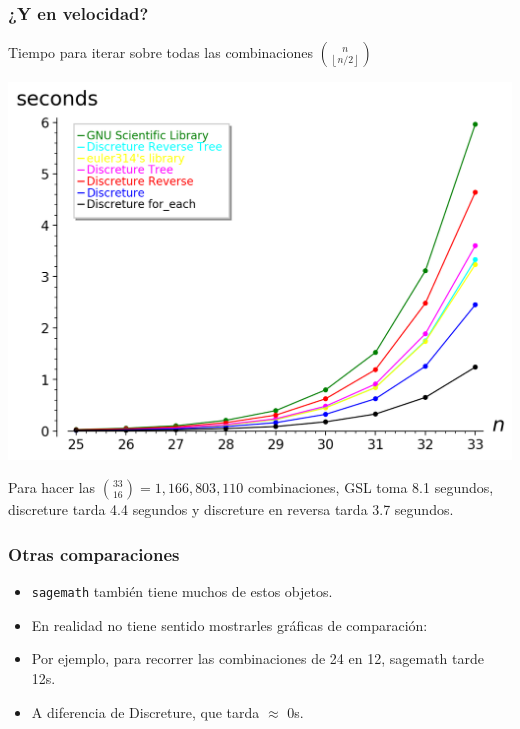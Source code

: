 \documentclass[spanish,professionalfonts]{beamer}
\def\tcr#1{\textcolor{MyRed}{#1}}
\def\tcb#1{\textcolor{MyBlue}{#1}}
\def\tcg#1{\textcolor{MyGreen}{#1}}
\begin{document}
\begin{frame}\frametitle{¿Y en velocidad?}\pause
Tiempo para iterar sobre todas las combinaciones $\binom{n}{\left\lfloor n/2 \right\rfloor}$ \pause
  \begin{center}
    \includegraphics[scale=0.35]{./combvsgsl.png}
  \end{center}
  \pause
 Para hacer las $\binom{33}{16}=1,166,803,110$ combinaciones, \tcg{GSL toma 8.1 segundos}, \tcb{discreture tarda 4.4 segundos} y \tcr{discreture en reversa tarda 3.7 segundos}. 
\end{frame}

\begin{frame}\frametitle{Otras comparaciones}
  \begin{itemize}
    \item \texttt{sagemath} también tiene muchos de estos objetos. \pause
    \item En realidad no tiene sentido mostrarles gráficas de comparación: \pause
    \item Por ejemplo, para recorrer las combinaciones de 24 en 12, sagemath tarde 12s. \pause
    \item A diferencia de Discreture, que tarda  $\approx$ 0s.
  \end{itemize}
\end{frame}
\end{document}
